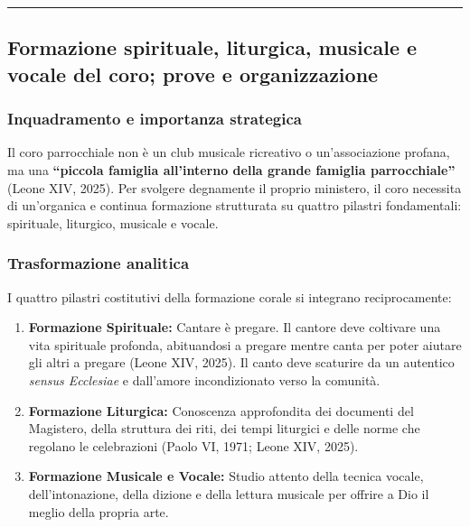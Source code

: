 \documentclass[12pt,a4paper]{article}
\begin{document}
	\begin{center}\rule{0.5\linewidth}{0.5pt}\end{center}
	
	\subsection{Formazione spirituale, liturgica, musicale e vocale del coro; prove e organizzazione}\label{formazione-spirituale-liturgica-musicale-e-vocale-del-coro-prove-e-organizzazione}
	
	\subsubsection{Inquadramento e importanza strategica}\label{inquadramento-e-importanza-strategica-11}
	
	Il coro parrocchiale non è un club musicale ricreativo o un'associazione profana, ma una \textbf{``piccola famiglia all'interno della grande famiglia parrocchiale''} (Leone XIV, 2025). Per svolgere degnamente il proprio ministero, il coro necessita di un'organica e continua formazione strutturata su quattro pilastri fondamentali: spirituale, liturgico, musicale e vocale.
	
	\subsubsection{Trasformazione analitica}\label{trasformazione-analitica-12}
	
	I quattro pilastri costitutivi della formazione corale si integrano reciprocamente:
	
	\begin{enumerate}[label=\arabic*.,leftmargin=*]
		\item \textbf{Formazione Spirituale:} Cantare è pregare. Il cantore deve coltivare una vita spirituale profonda, abituandosi a pregare mentre canta per poter aiutare gli altri a pregare (Leone XIV, 2025). Il canto deve scaturire da un autentico \emph{sensus Ecclesiae} e dall'amore incondizionato verso la comunità.
		\item \textbf{Formazione Liturgica:} Conoscenza approfondita dei documenti del Magistero, della struttura dei riti, dei tempi liturgici e delle norme che regolano le celebrazioni (Paolo VI, 1971; Leone XIV, 2025).
		\item \textbf{Formazione Musicale e Vocale:} Studio attento della tecnica vocale, dell'intonazione, della dizione e della lettura musicale per offrire a Dio il meglio della propria arte.
	\end{enumerate}
	
\end{document}
